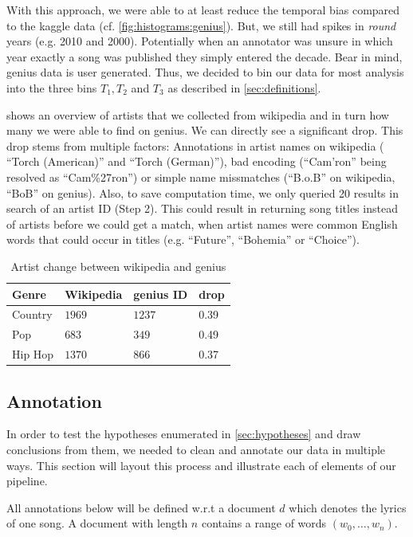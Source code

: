 \documentclass[11pt,a4paper]{article}
\begin{document}
With this approach, we were able to at least reduce the temporal bias compared to the kaggle data (cf. \cref{fig:histograms:genius}). But, we still had spikes in \emph{round} years (e.g. 2010 and 2000). Potentially when an annotator was unsure in which year exactly a song was published they simply entered the decade. Bear in mind, genius data is user generated. Thus, we decided to bin our data for most analysis into the three bins $T_1, T_2$ and $T_3$ as described in \cref{sec:definitions}.


 shows an overview of artists that we collected from wikipedia and in turn how many we were able to find on genius. We can directly see a significant drop. This drop stems from multiple factors: Annotations in artist names on wikipedia ( \enquote{Torch (American)} and \enquote{Torch (German)}), bad encoding (\enquote{Cam'ron} being resolved as \enquote{Cam\%27ron}) or simple name missmatches (\enquote{B.o.B} on wikipedia, \enquote{BoB} on genius). Also, to save computation time, we only queried 20 results in search of an artist ID (Step 2). This could result in returning song titles instead of artists before we could get a match, when artist names were common English words that could occur in titles (e.g. \enquote{Future}, \enquote{Bohemia} or \enquote{Choice}).

\begin{table}[t!]
\begin{tabular}{llll}
\hline
Genre & Wikipedia & genius ID & drop \\ \hline 
Country & $1969$ & $1237$ & 0.39 \\
Pop & $683$ & $349$ & 0.49 \\
Hip Hop & $1370$ & $866$ & 0.37 \\ \hline
\end{tabular}
\caption{Artist change between wikipedia and genius}
\label{tab:scrape:idscomp}
\end{table}
\subsection{Annotation}\label{sec:annotations}

In order to test the hypotheses enumerated in \cref{sec:hypotheses} and draw conclusions from them, we needed to clean and annotate our data in multiple ways. This section will layout this process and illustrate each of elements of our pipeline. 

All annotations below will be defined w.r.t a document $d$ which denotes the lyrics of one song. A document with length $n$ contains a range of words $(w_0, \ldots, w_n)$. 
\end{document}
